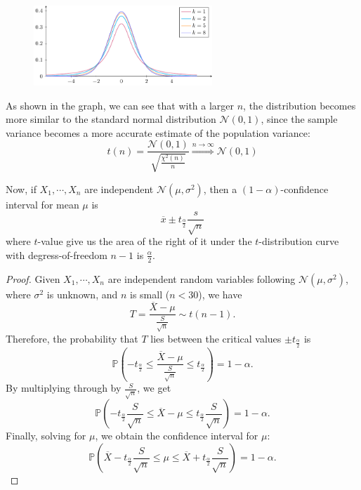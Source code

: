 \begin{figure}[H]
  \centering
  \includegraphics[width=0.6\textwidth]{Figures/t-dis.pdf}
\end{figure}

As shown in the graph, we can see that with a larger \(n\), the distribution becomes more similar to the standard normal distribution \(\mathcal{N}(0, 1)\), since the sample variance becomes a more accurate estimate of the population variance: 
\[
  t(n) = \dfrac{\mathcal{N}(0, 1)}{\sqrt{\frac{\chi^2(n)}{n}}} \overset{n \to \infty}{\Longrightarrow} \mathcal{N} (0, 1)
\]

Now, if \(X_1, \cdots, X_n\) are independent \(\mathcal{N} (\mu, \sigma^2)\), then a \((1 - \alpha)\)-confidence interval for mean \(\mu\) is 
\[
  \overline{x} \pm t_{\frac{\alpha}{2}}\dfrac{s}{\sqrt{n}}
\]
where \(t\)-value give us the area of the right of it under the \(t\)-distribution curve with degress-of-freedom \(n - 1\) is \(\frac{\alpha}{2}\). 

\begin{proof}
  Given \(X_1, \cdots, X_n\) are independent random variables following \(\mathcal{N}(\mu, \sigma^2)\), where \(\sigma^2\) is unknown, and \(n\) is small (\(n < 30\)), we have
  \[
    T = \frac{\overline{X} - \mu}{\frac{S}{\sqrt{n}}} \sim t(n - 1).
  \]
  Therefore, the probability that \(T\) lies between the critical values \( \pm t_{\frac{\alpha}{2}} \) is
  \[
    \mathbb{P}\left(-t_{\frac{\alpha}{2}} \leq \dfrac{\overline{X} - \mu}{\frac{S}{\sqrt{n}}} \leq t_{\frac{\alpha}{2}}\right) = 1 - \alpha.
  \]
  By multiplying through by \(\frac{S}{\sqrt{n}}\), we get
  \[
    \mathbb{P}\left(-t_{\frac{\alpha}{2}}\frac{S}{\sqrt{n}} \leq \overline{X} - \mu \leq t_{\frac{\alpha}{2}}\frac{S}{\sqrt{n}}\right) = 1 - \alpha.
  \]
  Finally, solving for \(\mu\), we obtain the confidence interval for \(\mu\):
  \[
    \mathbb{P}\left(\overline{X} - t_{\frac{\alpha}{2}}\frac{S}{\sqrt{n}} \leq \mu \leq \overline{X} + t_{\frac{\alpha}{2}}\frac{S}{\sqrt{n}}\right) = 1 - \alpha.
  \]
\end{proof}

